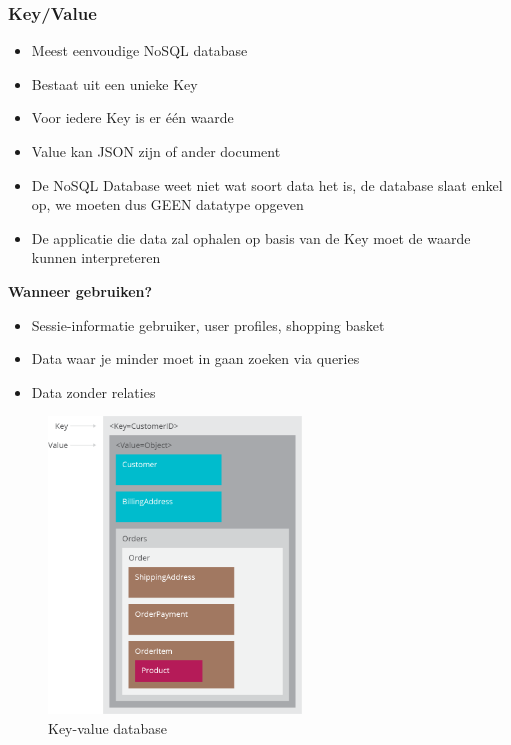 \documentclass{article}
\newcommand{\bold}[1]{\textbf{#1}}
\begin{document}
\subsubsection{Key/Value}

\begin{itemize}
    \item Meest eenvoudige NoSQL database
    \item Bestaat uit een unieke Key
    \item Voor iedere Key is er één waarde
    \item Value kan JSON zijn of ander document
    \item De NoSQL Database weet niet wat soort data het is, de database slaat enkel op, we moeten dus GEEN datatype opgeven
    \item De applicatie die data zal ophalen op basis van de Key moet de waarde kunnen interpreteren
\end{itemize}

\bold{Wanneer gebruiken?}

\begin{itemize}
    \item Sessie-informatie gebruiker, user profiles, shopping basket
    \item Data waar je minder moet in gaan zoeken via queries
    \item Data zonder relaties
\end{itemize}

\begin{figure}[H]
    \centering
    \includegraphics[width=0.6\textwidth]{key-value.png}
    \caption{Key-value database}
\end{figure}
\end{document}
